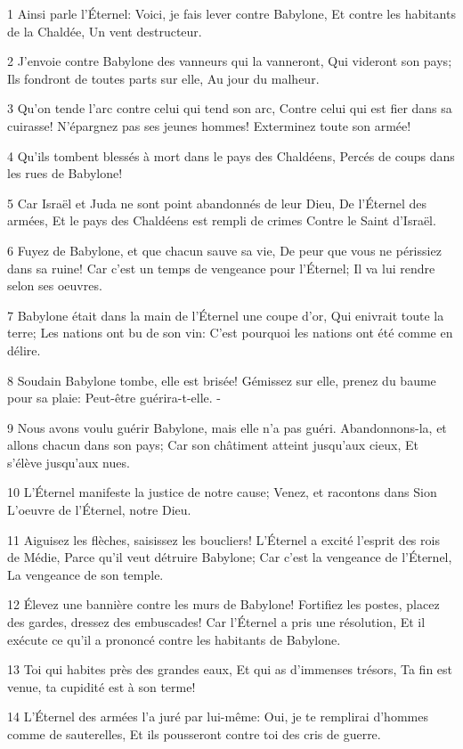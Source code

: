 \par 1 Ainsi parle l'Éternel: Voici, je fais lever contre Babylone, Et contre les habitants de la Chaldée, Un vent destructeur.
\par 2 J'envoie contre Babylone des vanneurs qui la vanneront, Qui videront son pays; Ils fondront de toutes parts sur elle, Au jour du malheur.
\par 3 Qu'on tende l'arc contre celui qui tend son arc, Contre celui qui est fier dans sa cuirasse! N'épargnez pas ses jeunes hommes! Exterminez toute son armée!
\par 4 Qu'ils tombent blessés à mort dans le pays des Chaldéens, Percés de coups dans les rues de Babylone!
\par 5 Car Israël et Juda ne sont point abandonnés de leur Dieu, De l'Éternel des armées, Et le pays des Chaldéens est rempli de crimes Contre le Saint d'Israël.
\par 6 Fuyez de Babylone, et que chacun sauve sa vie, De peur que vous ne périssiez dans sa ruine! Car c'est un temps de vengeance pour l'Éternel; Il va lui rendre selon ses oeuvres.
\par 7 Babylone était dans la main de l'Éternel une coupe d'or, Qui enivrait toute la terre; Les nations ont bu de son vin: C'est pourquoi les nations ont été comme en délire.
\par 8 Soudain Babylone tombe, elle est brisée! Gémissez sur elle, prenez du baume pour sa plaie: Peut-être guérira-t-elle. -
\par 9 Nous avons voulu guérir Babylone, mais elle n'a pas guéri. Abandonnons-la, et allons chacun dans son pays; Car son châtiment atteint jusqu'aux cieux, Et s'élève jusqu'aux nues.
\par 10 L'Éternel manifeste la justice de notre cause; Venez, et racontons dans Sion L'oeuvre de l'Éternel, notre Dieu.
\par 11 Aiguisez les flèches, saisissez les boucliers! L'Éternel a excité l'esprit des rois de Médie, Parce qu'il veut détruire Babylone; Car c'est la vengeance de l'Éternel, La vengeance de son temple.
\par 12 Élevez une bannière contre les murs de Babylone! Fortifiez les postes, placez des gardes, dressez des embuscades! Car l'Éternel a pris une résolution, Et il exécute ce qu'il a prononcé contre les habitants de Babylone.
\par 13 Toi qui habites près des grandes eaux, Et qui as d'immenses trésors, Ta fin est venue, ta cupidité est à son terme!
\par 14 L'Éternel des armées l'a juré par lui-même: Oui, je te remplirai d'hommes comme de sauterelles, Et ils pousseront contre toi des cris de guerre.
